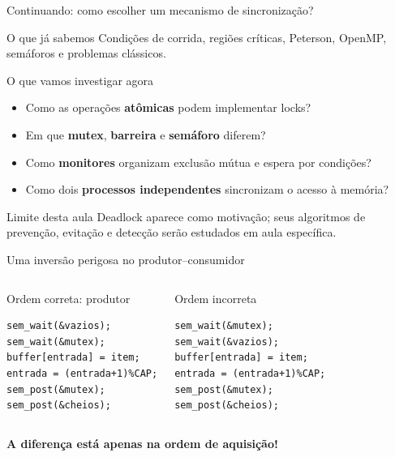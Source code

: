 \documentclass[aspectratio=169,11pt]{beamer}
\begin{document}
\begin{frame}{Continuando: como escolher um mecanismo de sincronização?}
\small
\begin{block}{O que já sabemos}
Condições de corrida, regiões críticas, Peterson, OpenMP, semáforos e problemas clássicos.
\end{block}
\begin{block}{O que vamos investigar agora}
\begin{itemize}
\item Como as operações \textbf{atômicas} podem implementar locks?
\item Em que \textbf{mutex}, \textbf{barreira} e \textbf{semáforo} diferem?
\item Como \textbf{monitores} organizam exclusão mútua e espera por condições?
\item Como dois \textbf{processos independentes} sincronizam o acesso à memória?
\end{itemize}
\end{block}
\begin{alertblock}{Limite desta aula}
Deadlock aparece como motivação; seus algoritmos de prevenção, evitação e detecção serão estudados em aula específica.
\end{alertblock}
\end{frame}

\begin{frame}[fragile]{Uma inversão perigosa no produtor--consumidor}
\small
\begin{columns}[T]
\begin{block}{Ordem correta: produtor}
\begin{verbatim}
sem_wait(&vazios);
sem_wait(&mutex);
buffer[entrada] = item;
entrada = (entrada+1)%CAP;
sem_post(&mutex);
sem_post(&cheios);
\end{verbatim}
\end{block}
\begin{alertblock}{Ordem incorreta}
\begin{verbatim}
sem_wait(&mutex);
sem_wait(&vazios);
buffer[entrada] = item;
entrada = (entrada+1)%CAP;
sem_post(&mutex);
sem_post(&cheios);
\end{verbatim}
\end{alertblock}
\end{columns}
\vspace{.2cm}
\centering\textbf{A diferença está apenas na ordem de aquisição!}
\end{frame}
\end{document}
